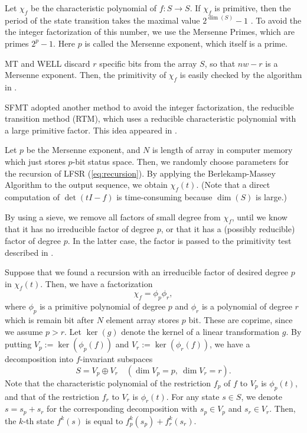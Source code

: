 \documentclass{svmult}
\begin{document}
Let $\chi_f$ be the characteristic polynomial of $f:S \to S$.  If
$\chi_f$ is primitive, then the period of the state transition takes
the maximal value $2^{\dim(S)}-1$ \cite[\S3.2.2]{knuth:bible}.  To
avoid the the integer factorization of this number, we use the
Mersenne Primes, which are primes $2^p-1$. Here $p$ is called the
Mersenne exponent, which itself is a prime.

MT and WELL\cite{WELL} discard $r$ specific bits from the
array $S$, so that $nw-r$ is a Mersenne exponent. 
Then, the primitivity of $\chi_f$ is easily checked
by the algorithm in \cite[\S3.2.2]{knuth:bible}.

SFMT adopted another method to avoid the integer factorization, the
reducible transition method (RTM), which uses a reducible
characteristic polynomial with a large primitive factor.  This idea
appeared in \cite{FUSHIMI90} \cite{BRENT}\cite{BRENT-PRIM}.

Let $p$ be the Mersenne exponent, and %
$N$ is length of array in computer memory which just stores $p$-bit
status space.
Then,
we randomly choose parameters for the recursion of LFSR
(\ref{eq:recursion}).  By applying the Berlekamp-Massey Algorithm to
the output sequence, we obtain $\chi_f(t)$.  (Note that a direct
computation of $\det(tI-f)$ is time-consuming because
$\dim(S)$ is large.)

By using a sieve, we remove all factors of small degree from $\chi_f$,
until we know that it has no irreducible factor of degree $p$, or that
it has a (possibly reducible) factor of degree $p$.  In the latter
case, the factor is passed to the primitivity test described in
\cite[\S3.2.2]{knuth:bible}.

Suppose that we found a recursion with an irreducible factor of
desired degree $p$ in $\chi_f(t)$. Then, we have a factorization
\[
\chi_f=\phi_p \phi_r,
\]
where $\phi_p$ is a primitive polynomial of degree $p$
and $\phi_r$ is a polynomial of degree %
$r$ which is remain bit after $N$ element array stores
$p$ bit.
These are coprime, 
since we assume $p>r$.
Let $\ker(g)$ denote the kernel of a linear transformation $g$.
By putting $V_p:=\ker \left(\phi_p(f)\right)$ 
and $V_r:=\ker \left(\phi_r(f)\right)$,
we have a decomposition into $f$-invariant subspaces
\[
S=V_p \oplus V_r \quad (\dim V_p=p, \ \dim V_r=r).
\]
Note that the characteristic polynomial of 
the restriction $f_p$ of $f$ to $V_p$ is $\phi_p(t)$, and
that of the restriction $f_r$ to $V_r$ is $\phi_r(t)$. 
For any state $s \in S$, we denote $s=s_p+s_r$ for the corresponding
decomposition with $s_p \in V_p$ and $s_r \in V_r$.
Then, the $k$-th state $f^k(s)$ is equal to
$f_p^k(s_p) + f_r^k(s_r)$. 
\end{document}
